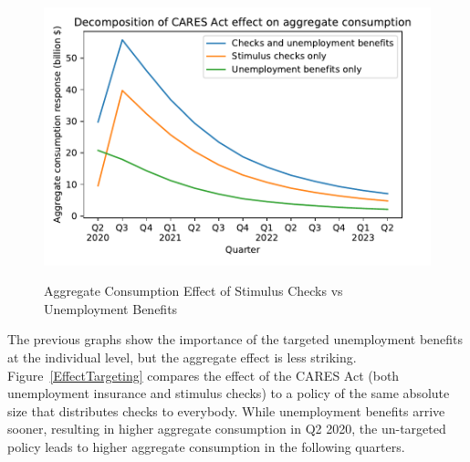 \documentclass[titlepage,a4paper]{\econtex}
\begin{document}
\begin{figure}
  \centering
  \caption{Aggregate Consumption Effect of Stimulus Checks vs Unemployment Benefits}
  \label{checks_vs_unemp}
  { \includegraphics[width=8in]{./Figures/Checks_vs_Unemp}}
\end{figure}

The previous graphs show the importance of the targeted unemployment benefits at the individual level, but the aggregate effect is less striking.
Figure~\ref{EffectTargeting} compares the effect of the CARES Act (both unemployment insurance and stimulus checks) to a policy of the same absolute size that distributes checks to everybody.
While unemployment benefits arrive sooner, resulting in higher aggregate consumption in Q2 2020, the un-targeted policy leads to higher aggregate consumption in the following quarters.
\end{document}
